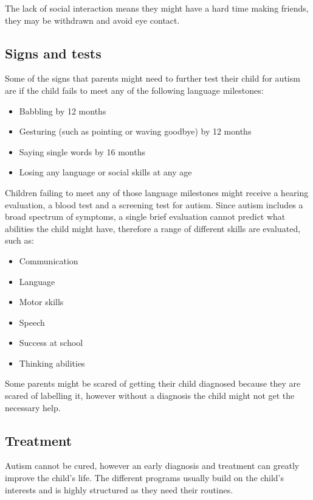 The lack of social interaction means they might have a hard time making friends, they may be withdrawn and avoid eye contact. 

\subsection*{Signs and tests}

Some of the signs that parents might need to further test their child for autism are if the child fails to meet any of the following language milestones:

\begin{itemize}
\item Babbling by 12 months
\item Gesturing (such as pointing or waving goodbye) by 12 months
\item Saying single words by 16 months
\item Losing any language or social skills at any age
\end{itemize}

Children failing to meet any of those language milestones might receive a hearing evaluation, a blood test and a screening test for autism. Since autism includes a broad spectrum of symptoms, a single brief evaluation cannot predict what abilities the child might have, therefore a range of different skills are evaluated, such as:

\begin{itemize}
\item Communication
\item Language
\item Motor skills
\item Speech
\item Success at school
\item Thinking abilities
\end{itemize}

Some parents might be scared of getting their child diagnosed because they are scared of labelling it, however without a diagnosis the child might not get the necessary help.\citep{autism} 

\subsection*{Treatment}

Autism cannot be cured, however an early diagnosis and treatment can greatly improve the child's life. The different programs usually build on the child's interests and is highly structured as they need their routines. 
